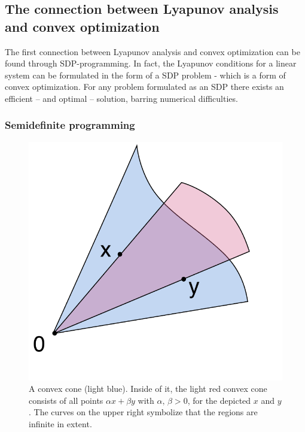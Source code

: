 \subsection{The connection between Lyapunov analysis and convex optimization}

The first connection between Lyapunov analysis and convex optimization can be
found through \ac{SDP}-programming. In fact, the Lyapunov conditions for a
linear system can be formulated in the form of a \ac{SDP} problem - which is a
form of convex optimization. For any problem formulated as an \ac{SDP} there
exists an efficient -- and optimal -- solution, barring numerical difficulties.

\subsubsection{Semidefinite programming}

\begin{figure}
  \centering
  \includegraphics[scale=.5]{figures/preliminaries/Convex_cone_illust}
  \caption{A convex cone (light blue). Inside of it, the light red convex cone
    consists of all points \(\alpha x + \beta y \) with \(\alpha,\, \beta > 0\),
    for the depicted \(x\) and \(y\). The curves on the upper right symbolize
    that the regions are infinite in extent.
    \cite{alexandrovConvexConeIllust2019}}
\end{figure}


